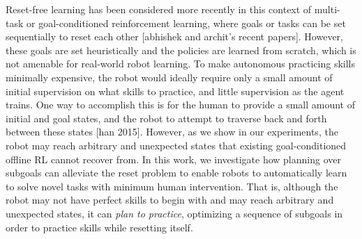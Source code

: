 Reset-free learning has been considered more recently in this context of multi-task or goal-conditioned reinforcement learning, where goals or tasks can be set sequentially to reset each other \cite{Gupta2021ResetFreeRL, Lu2021ResetFreeLL} [abhishek and archit's recent papers].
However, these goals are set heuristically and the policies are learned from scratch, which is not amenable for real-world robot learning.
To make autonomous practicing skills minimally expensive, the robot would ideally require only a small amount of initial supervision on what skills to practice, and little supervision as the agent trains.
One way to accomplish this is for the human to provide a small amount of initial and goal states, and the robot to attempt to traverse back and forth between these states [han 2015].
However, as we show in our experiments, the robot may reach arbitrary and unexpected states that existing goal-conditioned offline RL cannot recover from.
In this work, we investigate how planning over subgoals can alleviate the reset problem to enable robots to automatically learn to solve novel tasks
with minimum human intervention.
That is, although the robot may not have perfect skills to begin with and may reach arbitrary and unexpected states, it can \textit{plan to practice}, optimizing a sequence of subgoals in order to practice skills while resetting itself.

